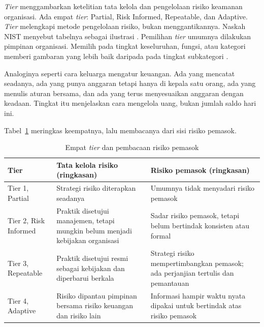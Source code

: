 \textit{Tier} menggambarkan ketelitian tata kelola dan pengelolaan risiko keamanan organisasi. Ada
empat \textit{tier}: Partial, Risk Informed, Repeatable, dan Adaptive. \textit{Tier} melengkapi
metode pengelolaan risiko, bukan menggantikannya. Naskah NIST menyebut tabelnya sebagai ilustrasi
\cite{nistcsf2}. Pemilihan \textit{tier} umumnya dilakukan pimpinan organisasi. Memilih pada tingkat
keseluruhan, fungsi, atau kategori memberi gambaran yang lebih baik daripada pada tingkat subkategori
\cite{c06-nist-sp1302}.

Analoginya seperti cara keluarga mengatur keuangan. Ada yang mencatat seadanya, ada yang punya
anggaran tetapi hanya di kepala satu orang, ada yang menulis aturan bersama, dan ada yang terus
menyesuaikan anggaran dengan keadaan. Tingkat itu menjelaskan cara mengelola uang, bukan jumlah saldo
hari ini.

Tabel~\ref{tab:ch06-tier} meringkas keempatnya, lalu membacanya dari sisi risiko pemasok.

\begin{table}[!htb]
  \centering\small
  \caption{Empat \textit{tier} dan pembacaan risiko pemasok}\label{tab:ch06-tier}
  \begin{tabularx}{\textwidth}{|>{\raggedright\arraybackslash}p{}|>{\raggedright\arraybackslash}X|>{\raggedright\arraybackslash}X|}
    \hline
    \textbf{Tier} & \textbf{Tata kelola risiko (ringkasan)} & \textbf{Risiko pemasok (ringkasan)} \\
    \hline
    Tier 1, Partial & Strategi risiko diterapkan seadanya & Umumnya tidak menyadari risiko pemasok \\
    \hline
    Tier 2, Risk Informed & Praktik disetujui manajemen, tetapi mungkin belum menjadi kebijakan
    organisasi & Sadar risiko pemasok, tetapi belum bertindak konsisten atau formal \\ \hline
    Tier 3, Repeatable & Praktik disetujui resmi sebagai kebijakan dan diperbarui berkala & Strategi
    risiko mempertimbangkan pemasok; ada perjanjian tertulis dan pemantauan \\ \hline
    Tier 4, Adaptive & Risiko dipantau pimpinan bersama risiko keuangan dan risiko lain & Informasi
    hampir waktu nyata dipakai untuk bertindak atas risiko pemasok \\ \hline
  \end{tabularx}
\end{table}

